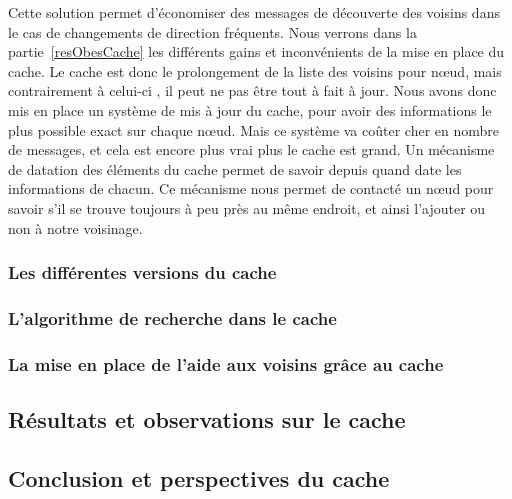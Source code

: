 \par Cette solution permet d'économiser des messages de découverte des voisins dans le cas de changements de direction fréquents. Nous verrons dans la partie~\ref{resObesCache} les différents gains et inconvénients de la mise en place du cache. Le cache est donc le prolongement de la liste des voisins pour nœud, mais contrairement à celui-ci , il peut ne pas être tout à fait à jour. Nous avons donc mis en place un système de mis à jour du cache, pour avoir des informations le plus possible exact sur chaque nœud. Mais ce système va coûter cher en nombre de messages, et cela est encore plus vrai plus le cache est grand. Un mécanisme de datation des éléments du cache permet de savoir depuis quand date les informations de chacun. Ce mécanisme nous permet de contacté un nœud pour savoir s'il se trouve toujours à peu près au même endroit, et ainsi l'ajouter ou non à notre voisinage. 

\subsubsection{Les différentes versions du cache}


\subsubsection{L'algorithme de recherche dans le cache}


\subsubsection{La mise en place de l'aide aux voisins grâce au cache}


\subsection{Résultats et observations sur le cache}
\label{resObsCache}

\subsection{Conclusion et perspectives du cache} 



